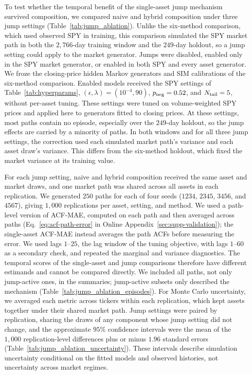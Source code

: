 To test whether the temporal benefit of the single-asset jump
mechanism survived composition, we compared naive and hybrid
composition under three jump settings (Table~\ref{tab:jump_ablation}).
Unlike the six-method comparison, which used observed SPY in
training, this comparison simulated the SPY market path in both the
$2{,}766$-day training window and the $249$-day holdout, so a jump
setting could apply to the market generator. Jumps were disabled,
enabled only in the SPY market generator, or enabled in both SPY and
every asset generator. We froze the closing-price hidden Markov generators and SIM
calibrations of the six-method comparison. Enabled models
received the SPY settings of Table~\ref{tab:hyperparams},
$(\epsilon,\lambda)=(10^{-4},90)$, $p_{\rm neg}=0.52$, and
$N_{\rm tail}=5$, without per-asset tuning. These settings were tuned on volume-weighted SPY prices and applied
here to generators fitted to closing prices. At these settings,
most paths contain no episode, especially over the $249$-day holdout,
so the jump effects are carried by a minority of paths. In both windows and for all three jump settings, the correction used
each simulated market path's variance and each asset draw's variance.
This differs from the six-method holdout, which fixed the market
variance at its training value.

For each jump setting, naive and hybrid composition received the same
asset and market draws, and one market path was
shared across all assets in each replication. We generated $250$
paths for each of four seeds ($1234$, $2345$, $3456$, and $4567$),
giving $1{,}000$ replications per asset, setting, and method. We used a path-level version of ACF-MAE, computed on each path and
then averaged across paths (Eq.~\eqref{eq:acf-path-error} in Online
Appendix~\ref{sec:supp-validation}); the single-asset ACF-MAE instead
averages the path ACFs before measuring the error. We used
lags $1$--$25$, the lag window of the tuning objective, with lags
$1$--$60$ as a secondary check, and repeated the marginal and variance
diagnostics. The temporal scores of the single-asset and jump comparisons
therefore have different estimands and cannot be compared directly. We included all paths, not only jump-active ones, in the summaries;
jump-active subsets only described the mechanism
(Table~\ref{tab:jump_ablation_episodes}). For Monte Carlo uncertainty, we averaged each metric across tickers
within each replication, which kept assets together under their
shared market path. Jump settings were paired by replication, sharing
the draws of any component whose jump setting did not change, and the
approximate $95\%$ confidence intervals were the mean of the $1{,}000$
replication-level differences plus or minus $1.96$ standard errors
(Table~\ref{tab:jump_ablation_uncertainty}). These intervals describe simulation
uncertainty conditional on the fitted models and observed histories,
not uncertainty across market regimes.

